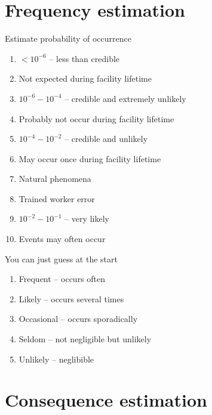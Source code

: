 \documentclass[aspectratio=1610,pdftex,dvipsnames,compress,xcolor={dvipsnames}]{beamer}
\begin{document}
\section{Frequency estimation}


\addtocounter{framenumber}{-2}
\begin{frame}{Estimate probability of occurrence}
    \begin{enumerate}[series=outerlist,topsep=0pt,itemsep=3pt,leftmargin=*,label=(\arabic*)]
        \item[]$< 10^{-6}$ -- less than credible 
        \item[]Not expected during facility lifetime
            \vspace{0.10in}
        \item[]$10^{-6} - 10^{-4}$ -- credible and extremely unlikely
        \item[]Probably not occur during facility lifetime
            \vspace{0.10in}
        \item[]$10^{-4} - 10^{-2}$ -- credible and unlikely
        \item[]May occur once during facility lifetime
        \item[]Natural phenomena
        \item[]Trained worker error
            \vspace{0.10in}
        \item[]$10^{-2} - 10^{-1}$ -- very likely
        \item[]Events may often occur
    \end{enumerate}
\end{frame}


\begin{frame}{You can just guess at the start}
    \begin{enumerate}[series=outerlist,topsep=0pt,itemsep=21pt,leftmargin=*,label=(\arabic*)]
        \item[]Frequent -- occurs often
        \item[]Likely -- occurs several times
        \item[]Occasional -- occurs sporadically
        \item[]Seldom -- not negligible but unlikely
        \item[]Unlikely -- neglibible
    \end{enumerate}
\end{frame}


\section{Consequence estimation}
\end{document}
